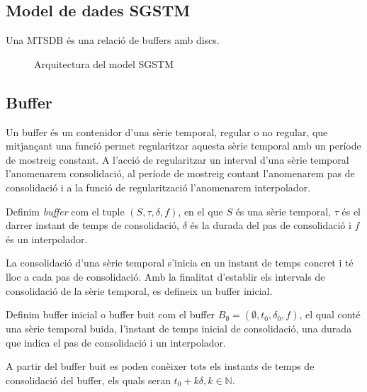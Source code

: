 \subsection{Model de dades SGSTM}

Una MTSDB és una relació de buffers amb discs. 


\begin{figure}[tp]
\centering

\caption{Arquitectura del model SGSTM}
\label{fig:model:bdstm}
\end{figure}


\subsection{Buffer}\label{sec:model:buffer}

Un buffer és un contenidor d'una sèrie temporal, regular o no regular, que mitjançant una funció permet regularitzar aquesta sèrie temporal amb un període de mostreig constant. A l'acció de regularitzar un interval d'una sèrie temporal l'anomenarem consolidació, al període de mostreig contant l'anomenarem pas de consolidació i a la funció de regularització l'anomenarem interpolador.

\begin{definition}[Buffer]
  Definim \emph{buffer} com el tuple $(S,\tau,\delta,f)$, en el que
  $S$ és una sèrie temporal, $\tau$ és el darrer instant de temps de
  consolidació, $\delta$ és la durada del pas de consolidació i $f$ és
  un interpolador.
\end{definition}

La consolidació d'una sèrie temporal s'inicia en un instant de temps concret i té lloc a cada pas de consolidació. Amb la finalitat d'establir els intervals de consolidació de la sèrie temporal, es defineix un buffer inicial.

\begin{definition}\label{def:model:buffer_buit}
  Definim buffer inicial o buffer buit com el buffer $B_{\emptyset} =
  (\emptyset,t_0, \delta_0, f)$, el qual
  conté una sèrie temporal buida, l'instant de temps inicial de
  consolidació, una durada que indica el pas de consolidació i un
  interpolador.
\end{definition}

A partir del buffer buit es poden conèixer tots els instants de temps de consolidació del buffer, els quals seran $t_0+k\delta, k\in\mathbb{N}$. 



